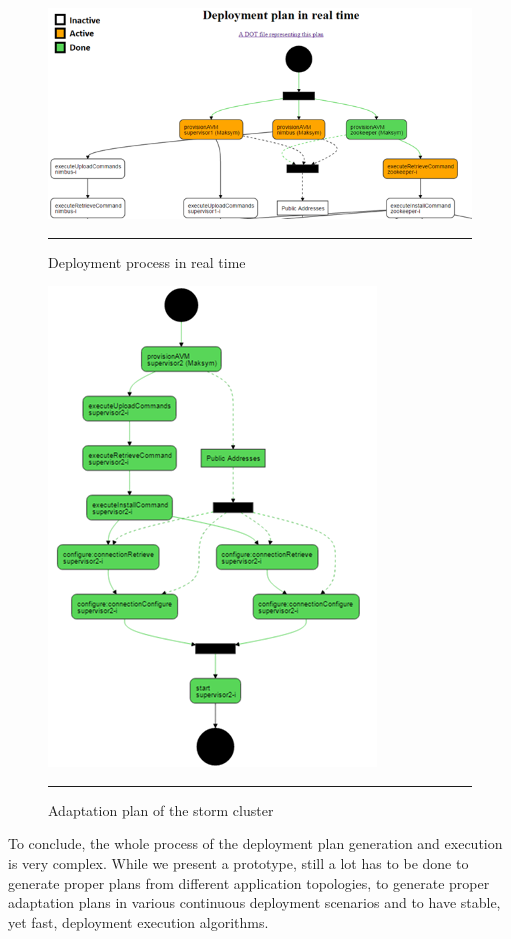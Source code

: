 \noindent 

\begin{figure}[htbp]
	\centering
		\includegraphics[width=38em]{./Figures/Realtime}
		\rule{38em}{0.5pt}
	\caption[Real-time Deployment]{Deployment process in real time}
	\label{fig:realtime}
\end{figure}

\begin{figure}[htbp]
	\centering
		\includegraphics{./Figures/Adaptation}
		\rule{38em}{0.5pt}
	\caption[Adaptation Plan]{Adaptation plan of the storm cluster}
	\label{fig:adaptation}
\end{figure}


\noindent To conclude, the whole process of the deployment plan generation and execution is very complex. While we present a prototype, still a lot has to be done to generate proper plans from different application topologies, to generate proper adaptation plans in various continuous deployment scenarios and to have stable, yet fast, deployment execution algorithms. 



